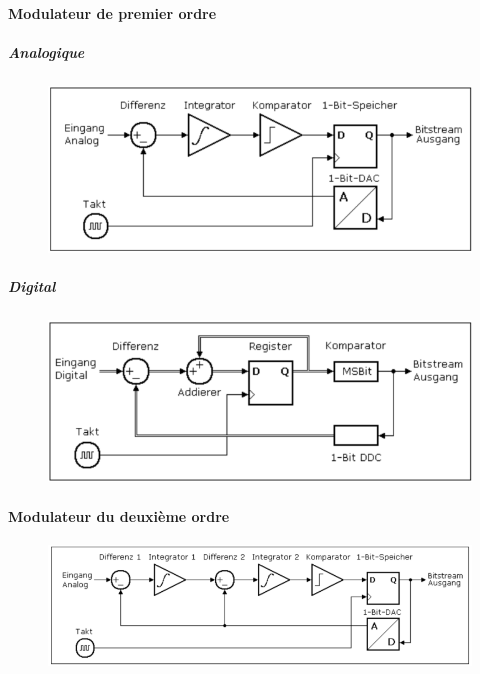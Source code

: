 \documentclass[resume]{subfiles}
\begin{document}
\begin{multicols}{3}
\paragraph{Modulateur de premier ordre}
\subparagraph{Analogique}
\begin{figure}[H]
    \centering
    \includegraphics[width=0.8\columnwidth]{../images/OpAmp1/1ordreSD.png}
\end{figure}

\subparagraph{Digital}
\begin{figure}[H]
    \centering
    \includegraphics[width=0.8\columnwidth]{../images/OpAmp1/1ordreSDnum.png}
\end{figure}

\paragraph{Modulateur du deuxième ordre}
\begin{figure}[H]
    \centering
    \includegraphics[width=0.8\columnwidth]{../images/OpAmp1/2ordreSD.png}
\end{figure}


\end{multicols}
\end{document}
